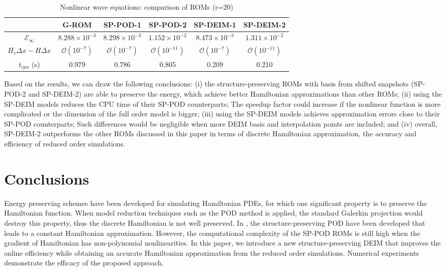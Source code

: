\documentclass[11pt]{article}
\begin{document}
\begin{table}[htp]
\begin{center}
\caption{Nonlinear wave equations: comparison of ROMs (r=20)}
\label{tab: ex2}
\begin{tabular}{| c | c | c | c | c | c |} \hline
  {}                    &   G-ROM                 & SP-POD-1               & SP-POD-2                & SP-DEIM-1             & SP-DEIM-2 \\ \hline
  $\mathcal{E}_\infty$  &  $8.288\times 10^{-3}$  & $8.298\times 10^{-3}$  & $1.152\times 10^{-2}$   & $8.473\times 10^{-3}$ & $1.311\times 10^{-2}$   \\
  $H_r\Delta x-H\Delta x$    			& $\mathcal{O}(10^{-7})$  & $\mathcal{O}(10^{-7})$ & $\mathcal{O}(10^{-11})$ & $\mathcal{O}(10^{-7})$& $\mathcal{O}(10^{-11})$ \\     
  $t_{cpu}$ (s)    		& 0.979                   & 0.786                  & 0.805                   & 0.209                 & 0.210 \\ 
  \hline
  
\end{tabular}
\end{center}
\end{table}

Based on the results, we can draw the following conclusions:
(i) the structure-preserving ROMs with basis from shifted snapshots (SP-POD-2 and SP-DEIM-2)  are able to preserve the energy, which achieve better Hamiltonian approximations than other ROMs;
(ii) using the SP-DEIM models reduces the CPU time of their SP-POD counterparts; The speedup factor could increase if the nonlinear function is more complicated or the dimension of the full order model is bigger; 
(iii) using the SP-DEIM models achieves approximation errors close to their SP-POD counterparts; Such differences would be negligible when more DEIM basis and interpolation points are included; 
and
(iv) overall, SP-DEIM-2 outperforms the other ROMs discussed in this paper in terms of discrete Hamiltonian approximation, the accuracy and efficiency of reduced order simulations.

\section{Conclusions}
\noindent \indent Energy preserving schemes have been developed for simulating Hamiltonian PDEs, for which one significant property is to preserve the Hamiltonian function. When model reduction techniques such as the POD method is applied, the standard Galerkin projection would destroy this property, thus the discrete Hamiltonian is not well preserved.  
In \cite{gong2017structure}, the structure-preserving POD have been developed that leads to a constant Hamiltonian approximation.  
However, the computational complexity of the SP-POD ROMs is still high when the gradient of Hamiltonian has non-polynomial  nonlinearities. 
In this paper, we introduce a new structure-preserving DEIM that improves the online efficiency while obtaining an accurate Hamiltonian approximation from the reduced order simulations. 
Numerical experiments demonstrate the efficacy of the proposed approach.
\end{document}
